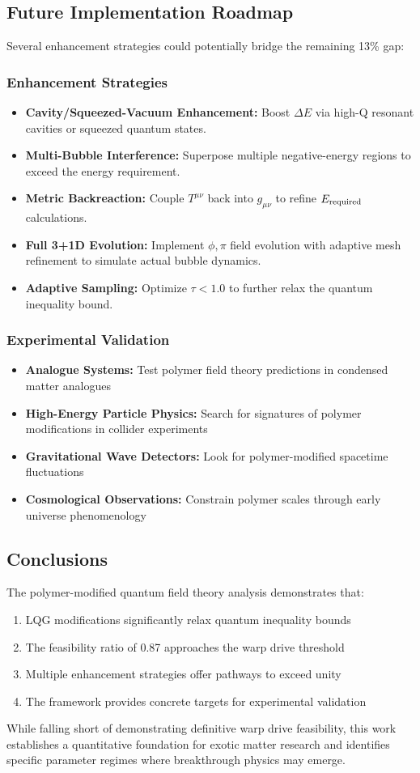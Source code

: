 \documentclass[11pt]{article}
\begin{document}
\subsection*{Future Implementation Roadmap}
Several enhancement strategies could potentially bridge the remaining 13\% gap:

\subsubsection*{Enhancement Strategies}
\begin{itemize}
  \item \textbf{Cavity/Squeezed-Vacuum Enhancement:}
        Boost $\Delta E$ via high-Q resonant cavities or squeezed quantum states.
  \item \textbf{Multi-Bubble Interference:}
        Superpose multiple negative-energy regions to exceed the energy requirement.
  \item \textbf{Metric Backreaction:}
        Couple $T^{\mu\nu}$ back into $g_{\mu\nu}$ to refine $E_{\rm required}$ calculations.
  \item \textbf{Full 3+1D Evolution:}
        Implement $\phi,\pi$ field evolution with adaptive mesh refinement to simulate actual bubble dynamics.
  \item \textbf{Adaptive Sampling:}
        Optimize $\tau < 1.0$ to further relax the quantum inequality bound.
\end{itemize}

\subsubsection*{Experimental Validation}
\begin{itemize}
  \item \textbf{Analogue Systems:} Test polymer field theory predictions in condensed matter analogues
  \item \textbf{High-Energy Particle Physics:} Search for signatures of polymer modifications in collider experiments  
  \item \textbf{Gravitational Wave Detectors:} Look for polymer-modified spacetime fluctuations
  \item \textbf{Cosmological Observations:} Constrain polymer scales through early universe phenomenology
\end{itemize}

\subsection*{Conclusions}
The polymer-modified quantum field theory analysis demonstrates that:
\begin{enumerate}
  \item LQG modifications significantly relax quantum inequality bounds
  \item The feasibility ratio of 0.87 approaches the warp drive threshold
  \item Multiple enhancement strategies offer pathways to exceed unity
  \item The framework provides concrete targets for experimental validation
\end{enumerate}

While falling short of demonstrating definitive warp drive feasibility, this work establishes a quantitative foundation for exotic matter research and identifies specific parameter regimes where breakthrough physics may emerge.
\end{document}

